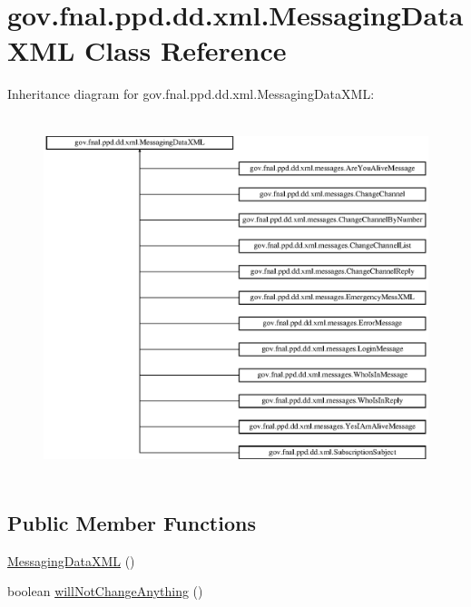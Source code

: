 \hypertarget{classgov_1_1fnal_1_1ppd_1_1dd_1_1xml_1_1MessagingDataXML}{\section{gov.\-fnal.\-ppd.\-dd.\-xml.\-Messaging\-Data\-X\-M\-L Class Reference}
\label{classgov_1_1fnal_1_1ppd_1_1dd_1_1xml_1_1MessagingDataXML}
}
Inheritance diagram for gov.\-fnal.\-ppd.\-dd.\-xml.\-Messaging\-Data\-X\-M\-L\-:\begin{figure}[H]
\begin{center}
\leavevmode
\includegraphics[height=10.581395cm]{classgov_1_1fnal_1_1ppd_1_1dd_1_1xml_1_1MessagingDataXML}
\end{center}
\end{figure}
\subsection*{Public Member Functions}
\begin{DoxyCompactItemize}
\item 
\hyperlink{classgov_1_1fnal_1_1ppd_1_1dd_1_1xml_1_1MessagingDataXML_a8238491f91725f4597199a711c774ece}{Messaging\-Data\-X\-M\-L} ()
\item 
boolean \hyperlink{classgov_1_1fnal_1_1ppd_1_1dd_1_1xml_1_1MessagingDataXML_a477db02871dbbabbf8860c6cab5958a6}{will\-Not\-Change\-Anything} ()
\end{DoxyCompactItemize}


